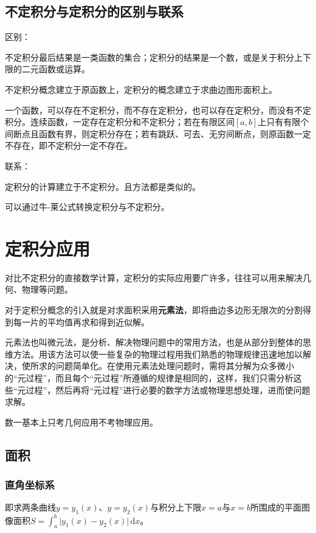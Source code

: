\documentclass[UTF8, 12pt]{ctexart}
\begin{document}
\subsection{不定积分与定积分的区别与联系}

区别：

不定积分最后结果是一类函数的集合；定积分的结果是一个数，或是关于积分上下限的二元函数或运算。

不定积分概念建立于原函数上，定积分的概念建立于求曲边图形面积上。

一个函数，可以存在不定积分，而不存在定积分，也可以存在定积分，而没有不定积分。连续函数，一定存在定积分和不定积分；若在有限区间$[a,b]$上只有有限个间断点且函数有界，则定积分存在；若有跳跃、可去、无穷间断点，则原函数一定不存在，即不定积分一定不存在。

联系：

定积分的计算建立于不定积分。且方法都是类似的。

可以通过牛-莱公式转换定积分与不定积分。

\section{定积分应用}

对比不定积分的直接数学计算，定积分的实际应用要广许多，往往可以用来解决几何、物理等问题。

对于定积分概念的引入就是对求面积采用\textbf{元素法}，即将曲边多边形无限次的分割得到每一片的平均值再求和得到近似解。

元素法也叫微元法，是分析、解决物理问题中的常用方法，也是从部分到整体的思维方法。用该方法可以使一些复杂的物理过程用我们熟悉的物理规律迅速地加以解决，使所求的问题简单化。在使用元素法处理问题时，需将其分解为众多微小的“元过程”，而且每个“元过程”所遵循的规律是相同的，这样，我们只需分析这些“元过程”，然后再将“元过程”进行必要的数学方法或物理思想处理，进而使问题求解。

数一基本上只考几何应用不考物理应用。

\subsection{面积}

\subsubsection{直角坐标系}

即求两条曲线$y=y_1(x)$、$y=y_2(x)$与积分上下限$x=a$与$x=b$所围成的平面图像面积$S=\int_a^b\vert y_1(x)-y_2(x)\vert\,\textrm{d}x$。
\end{document}
